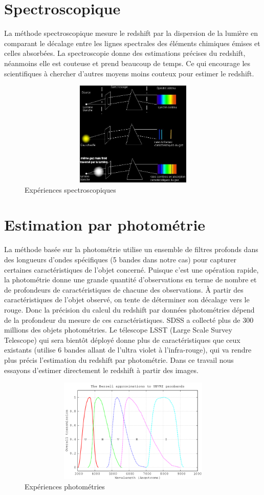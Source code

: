 \section*{Spectroscopique}
La méthode spectroscopique mesure le redshift par la dispersion de la lumière en comparant le décalage entre les lignes spectrales des éléments chimiques émises et celles absorbées. La spectroscopie donne des estimations précises du redshift, néanmoins elle est couteuse et prend beaucoup de temps. Ce qui encourage les scientifiques à chercher d'autres moyens moins couteux pour estimer le redshift.
\begin{figure}[H]
	\includegraphics[width = 13cm, height = 5cm]{images/spectroscopie.jpg}
	\caption{Expériences spectroscopiques}
	\label{spec}
\end{figure}   
\section*{Estimation par photométrie}
La méthode basée sur la photométrie utilise un ensemble de filtres profonds dans des longueurs d'ondes spécifiques (5 bandes dans notre cas) pour capturer certaines caractéristiques de l'objet concerné. Puisque c'est une opération rapide, la photométrie donne une grande quantité d'observations en terme de nombre et de profondeurs de caractéristiques de chacune des observations. À partir des caractéristiques de l'objet observé, on tente de déterminer son décalage vers le rouge. Donc la précision du calcul du redshift par données photométries dépend de la profondeur du mesure de ces caractéristiques. SDSS a collecté plus de 300 millions des objets photométries. Le télescope LSST (Large Scale Survey Telescope) qui sera bientôt déployé donne plus de caractéristiques que ceux existants (utilise 6 bandes allant de l'ultra violet à l'infra-rouge), qui va rendre plus précis l'estimation du redshift par photométrie. Dans ce travail nous essayons d'estimer directement le redshift à partir des images.

\begin{figure}[H]
	\includegraphics[width = 13cm, height = 5cm]{images/photometrie.png}
	\caption{Expériences photométries}
	\label{photo}
\end{figure}

